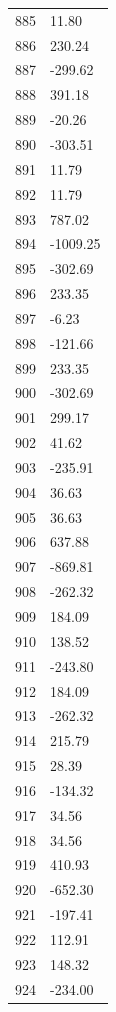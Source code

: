 \documentclass[a4paper,11pt]{article}
\begin{document}
\begin{center}
\begin{longtable}{|R{1.5cm}|R{2.5cm}|}
  885 &        11.80 \\
  886 &       230.24 \\
  887 &      -299.62 \\
  888 &       391.18 \\
  889 &       -20.26 \\
  890 &      -303.51 \\
  891 &        11.79 \\
  892 &        11.79 \\
 {\color{OliveGreen} 893} & {\color{OliveGreen}      787.02} \\
  894 &     -1009.25 \\
  895 &      -302.69 \\
  896 &       233.35 \\
  897 &        -6.23 \\
  898 &      -121.66 \\
  899 &       233.35 \\
  900 &      -302.69 \\
  901 &       299.17 \\
  902 &        41.62 \\
  903 &      -235.91 \\
  904 &        36.63 \\
  905 &        36.63 \\
  906 &       637.88 \\
  907 &      -869.81 \\
  908 &      -262.32 \\
  909 &       184.09 \\
  910 &       138.52 \\
  911 &      -243.80 \\
  912 &       184.09 \\
  913 &      -262.32 \\
  914 &       215.79 \\
  915 &        28.39 \\
  916 &      -134.32 \\
  917 &        34.56 \\
  918 &        34.56 \\
  919 &       410.93 \\
  920 &      -652.30 \\
  921 &      -197.41 \\
  922 &       112.91 \\
  923 &       148.32 \\
  924 &      -234.00 \\

\end{longtable}
\end{center}
\end{document}
